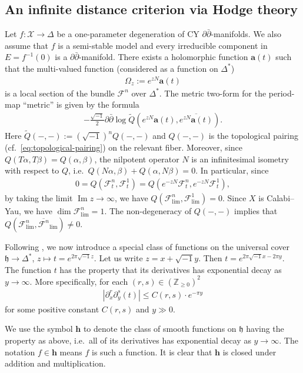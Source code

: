 \subsection{An infinite distance criterion via Hodge theory}
Let \(f\colon \mathcal{X}\to\Delta\) be a one-parameter 
degeneration of CY \(\partial\bar{\partial}\)-manifolds.
We also assume that \(f\) is a semi-stable model
and every irreducible component in \(E=f^{-1}(0)\) is
a \(\partial\bar{\partial}\)-manifold.
There exists a holomorphic function \(\mathbf{a}(t)\) such that
the multi-valued function (considered as a function on \(\Delta^{\ast}\))
\begin{eqnarray*}
\Omega_{z}:=e^{zN}\mathbf{a}(t)
\end{eqnarray*}
is a local section of the bundle \(\mathcal{F}^{n}\) over \(\Delta^{\ast}\).
The metric two-form for the 
period-map ``metric'' is given by the formula
\begin{eqnarray*}
-\frac{\sqrt{-1}}{2}
\partial\bar{\partial}\log \tilde{Q}(e^{zN}\mathbf{a}(t),\overline{e^{zN}\mathbf{a}(t)}).
\end{eqnarray*}
Here \(\tilde{Q}(-,-):=(\sqrt{-1})^{n}Q(-,-)\) and \(Q(-,-)\) is the topological pairing
(cf.~\eqref{eq:topological-pairing})
on the relevant fiber. Moreover, since \(Q(T\alpha,T\beta)=Q(\alpha,\beta)\),
the nilpotent operator \(N\) is an infinitesimal isometry with respect to \(Q\),
i.e.~\(Q(N\alpha,\beta)+Q(\alpha,N\beta)=0\). In particular, since
\begin{eqnarray*}
0=Q(\mathcal{F}^{n}_{t},\mathcal{F}^{1}_{t})=
Q(e^{-zN}\mathcal{F}^{n}_{t},e^{-zN}\mathcal{F}^{1}_{t}),
\end{eqnarray*}
by taking the limit \(\operatorname{Im}z\to\infty\), we have
\(Q(\mathcal{F}^{n}_{\mathrm{lim}},\mathcal{F}^{1}_{\mathrm{lim}})=0\).
Since \(X\) is Calabi--Yau, we have \(\dim\mathcal{F}^{n}_{\mathrm{lim}}=1\).
The non-degeneracy of \(Q(-,-)\) implies that
\(Q(\mathcal{F}^{n}_{\mathrm{lim}},\overline{\mathcal{F}^{n}}_{\mathrm{lim}})\ne 0\).

Following \cite{1997-Wang-on-the-incompleteness-of-the-weil-petersson-metric-along-degenerations-of-calabi-yau-manifolds}, we now introduce a special class of functions on the
universal cover \(\mathfrak{h}\to\Delta^{\ast}\), \(z\mapsto t=e^{2\pi\sqrt{-1}z}\).
Let us write \(z=x+\sqrt{-1}y\). Then \(t=e^{2\pi \sqrt{-1}x-2\pi y}\).
The function \(t\) has the property that its derivatives has exponential decay 
as \(y\to\infty\). More specifically, for each 
\((r,s)\in(\mathbb{Z}_{\ge 0})^{2}\)
\begin{eqnarray*}
|\partial_{x}^{r}\partial_{y}^{s}(t)|\le C(r,s)\cdot e^{-\pi y}
\end{eqnarray*}
for some positive constant \(C(r,s)\) and \(y\gg 0\).
\begin{notation}
We use the symbol \(\mathbf{h}\) to denote the class of 
smooth functions on \(\mathfrak{h}\)
having the property as above, i.e.~all of its derivatives has exponential decay 
as \(y\to\infty\). The notation \(f\in\mathbf{h}\) means
\(f\) is such a function. It is clear that \(\mathbf{h}\) is closed under
addition and multiplication.
\end{notation}


